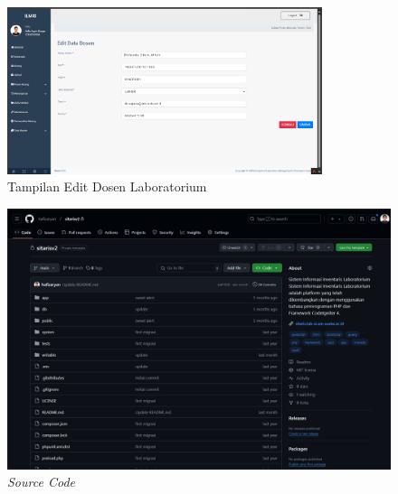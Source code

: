 \begin{figure}
	\centering
	\includegraphics[width=0.82\textwidth]{konten/gambar/hasil/edit-dosen.png}
	\caption{Tampilan Edit Dosen Laboratorium}
	\label{fig:edit-dosen}
\end{figure}

\begin{figure}[h]
	\centering
	\includegraphics[width=0.82\linewidth]{konten/gambar/source-code.png}
	\caption{\textit{Source Code}}
	\label{fig:source-code}
\end{figure}